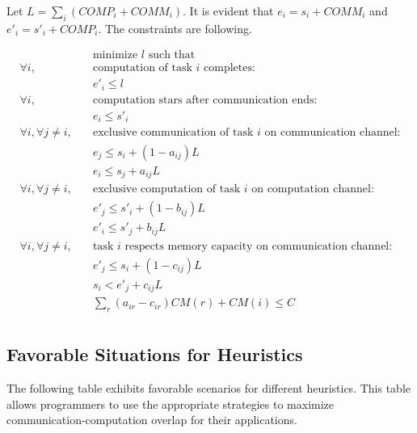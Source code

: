 \documentclass[runningheads]{llncs} %
\begin{document}



\noindent Let $L=\sum_i (COMP_i + COMM_i)$. It is evident that $e_i =s_i + COMM_i$ and $e'_i =s'_i + COMP_i$. The constraints are following.

\vspace*{-0.5cm}
\begin{align*}
& \text{minimize } l \text{ such that }\\
\forall i, \quad & \text{computation of task } i \text{ completes:}\\
& e'_i \leq l\\
\forall i, \quad & \text{computation stars after communication ends:}\\
& e_i \leq s'_i\\
\forall i, \forall j\ne i, \quad & \text{exclusive communication of task } i \text{ on communication channel:}\\
& e_j \leq s_i +(1-a_{ij})L\\
& e_i\leq s_j +a_{ij}L\\
\forall i, \forall j\ne i, \quad & \text{exclusive computation of task } i \text{ on computation channel:}\\
& e'_j \leq s'_i +(1-b_{ij})L\\
& e'_i\leq s'_j +b_{ij}L\\
\forall i, \forall j\ne i, \quad & \text{task } i \text{ respects memory capacity on communication channel:}\\
& e'_j \leq s_i +(1-c_{ij})L\\
& s_i< e'_j +c_{ij}L\\
& \sum_r (a_{ir} - c_{ir})CM(r) + CM(i) \le C\\
\end{align*} 

\subsection{Favorable Situations for Heuristics}
\noindent The following table exhibits favorable scenarios for different heuristics. This table allows programmers to use the appropriate strategies to maximize communication-computation overlap for their applications.
\end{document}
